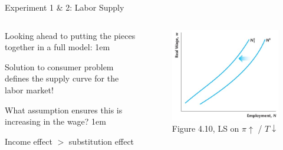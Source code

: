 \documentclass[11pt,aspectratio=43]{beamer}
\let\olditemize=\itemize
\let\endolditemize=\enditemize
\renewenvironment{itemize}{\olditemize \itemsep1em}{\endolditemize}
\theoremstyle{definition}
\begin{document}
\begin{frame}{Experiment 1 \& 2: Labor Supply}
\label{slide:Experiment_1____2__Labor_Supply}

    \begin{columns}
        \begin{column}{0.5\textwidth}
        Looking ahead to putting the pieces together in a full model:
        \begin{itemize}
            \item Solution to consumer problem defines the supply curve for the labor market!
            \item What assumption ensures this is increasing in the wage?
            \begin{itemize}
                \item Income effect $ > $ substitution effect
            \end{itemize}
        \end{itemize}
        \end{column}
        \begin{column}{0.5\textwidth}
            \begin{figure}
                \caption{Figure 4.10, LS on $ \pi \uparrow $ / $ T \downarrow  $}
                \includegraphics[width=\textwidth]{./figures/Figure4_10.jpg}
            \end{figure}
        \end{column}
    \end{columns}
\end{frame}
\end{document}
